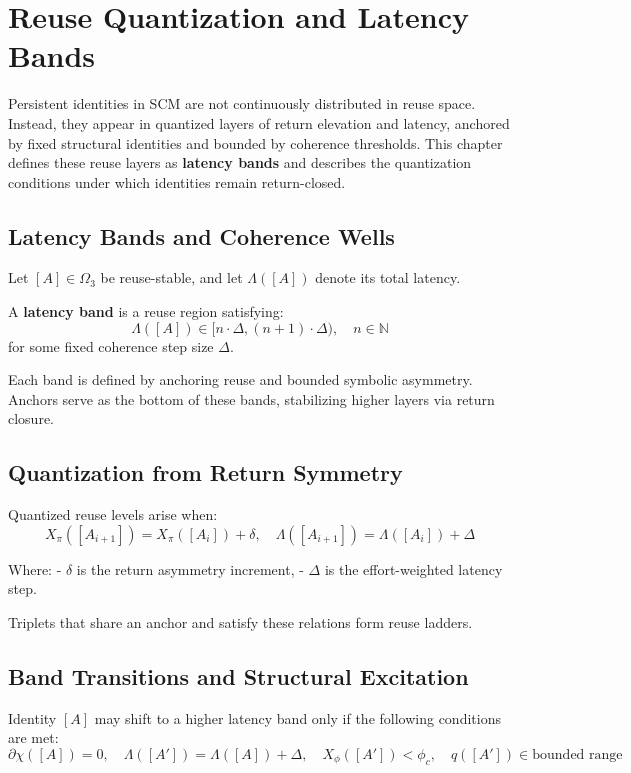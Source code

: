 \chapter{Reuse Quantization and Latency Bands} \label{chapter-latency-bands}

Persistent identities in SCM are not continuously distributed in reuse space. Instead, they appear in quantized layers of return elevation and latency, anchored by fixed structural identities and bounded by coherence thresholds. This chapter defines these reuse layers as \textbf{latency bands} and describes the quantization conditions under which identities remain return-closed.

\section{Latency Bands and Coherence Wells} \label{sec:latency-bands}

Let $[A] \in \Omega_3$ be reuse-stable, and let $\Lambda([A])$ denote its total latency.

A \textbf{latency band} is a reuse region satisfying:
\[
\Lambda([A]) \in [n \cdot \Delta, (n+1) \cdot \Delta),\quad n \in \mathbb{N}
\]
for some fixed coherence step size $\Delta$.

Each band is defined by anchoring reuse and bounded symbolic asymmetry. Anchors serve as the bottom of these bands, stabilizing higher layers via return closure.

\section{Quantization from Return Symmetry} \label{sec:return-quantization}

Quantized reuse levels arise when:
\[
X_\pi([A_{i+1}]) = X_\pi([A_i]) + \delta,\quad \Lambda([A_{i+1}]) = \Lambda([A_i]) + \Delta
\]

Where:
- $\delta$ is the return asymmetry increment,
- $\Delta$ is the effort-weighted latency step.

Triplets that share an anchor and satisfy these relations form reuse ladders.

\section{Band Transitions and Structural Excitation} \label{sec:band-transitions}

Identity $[A]$ may shift to a higher latency band only if the following conditions are met:
\[
\partial\chi([A]) = 0,\quad
\Lambda([A']) = \Lambda([A]) + \Delta,\quad
X_\phi([A']) < \phi_c,\quad
q([A']) \in \text{bounded range}
\]

